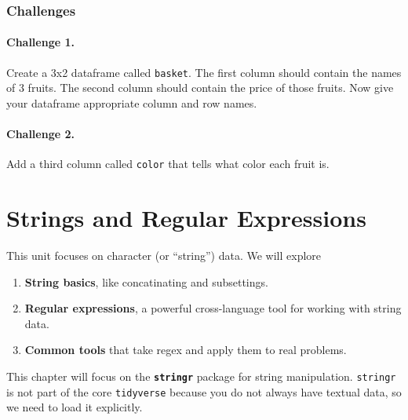\documentclass[
]{book}
\providecommand{\tightlist}{%
  \setlength{\itemsep}{0pt}\setlength{\parskip}{0pt}}
\begin{document}
\hypertarget{challenges-13}{%
\subsection{Challenges}\label{challenges-13}}

\hypertarget{challenge-1.-10}{%
\subsubsection*{Challenge 1.}\label{challenge-1.-10}}

Create a 3x2 dataframe called \texttt{basket}. The first column should contain the names of 3 fruits. The second column should contain the price of those fruits. Now give your dataframe appropriate column and row names.

\hypertarget{challenge-2.-9}{%
\subsubsection*{Challenge 2.}\label{challenge-2.-9}}

Add a third column called \texttt{color} that tells what color each fruit is.

\hypertarget{strings-and-regular-expressions}{%
\chapter{Strings and Regular Expressions}\label{strings-and-regular-expressions}}

This unit focuses on character (or ``string'') data. We will explore

\begin{enumerate}
\def\labelenumi{\arabic{enumi}.}
\tightlist
\item
  \textbf{String basics}, like concatinating and subsettings.
\item
  \textbf{Regular expressions}, a powerful cross-language tool for working with string data.
\item
  \textbf{Common tools} that take regex and apply them to real problems.
\end{enumerate}

This chapter will focus on the \textbf{\texttt{stringr}} package for string manipulation. \texttt{stringr} is not part of the core \texttt{tidyverse} because you do not always have textual data, so we need to load it explicitly.
\end{document}
